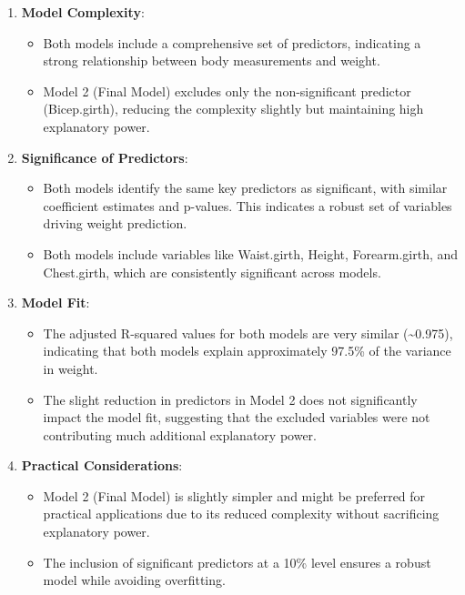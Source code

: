\documentclass[
]{article}
\providecommand{\tightlist}{%
  \setlength{\itemsep}{0pt}\setlength{\parskip}{0pt}}
\begin{document}
\begin{enumerate}
\def\labelenumi{\arabic{enumi}.}
\tightlist
\item
  \textbf{Model Complexity}:

  \begin{itemize}
  \tightlist
  \item
    Both models include a comprehensive set of predictors, indicating a
    strong relationship between body measurements and weight.
  \item
    Model 2 (Final Model) excludes only the non-significant predictor
    (Bicep.girth), reducing the complexity slightly but maintaining high
    explanatory power.
  \end{itemize}
\item
  \textbf{Significance of Predictors}:

  \begin{itemize}
  \tightlist
  \item
    Both models identify the same key predictors as significant, with
    similar coefficient estimates and p-values. This indicates a robust
    set of variables driving weight prediction.
  \item
    Both models include variables like Waist.girth, Height,
    Forearm.girth, and Chest.girth, which are consistently significant
    across models.
  \end{itemize}
\item
  \textbf{Model Fit}:

  \begin{itemize}
  \tightlist
  \item
    The adjusted R-squared values for both models are very similar
    (\textasciitilde0.975), indicating that both models explain
    approximately 97.5\% of the variance in weight.
  \item
    The slight reduction in predictors in Model 2 does not significantly
    impact the model fit, suggesting that the excluded variables were
    not contributing much additional explanatory power.
  \end{itemize}
\item
  \textbf{Practical Considerations}:

  \begin{itemize}
  \tightlist
  \item
    Model 2 (Final Model) is slightly simpler and might be preferred for
    practical applications due to its reduced complexity without
    sacrificing explanatory power.
  \item
    The inclusion of significant predictors at a 10\% level ensures a
    robust model while avoiding overfitting.
  \end{itemize}
\end{enumerate}
\end{document}
